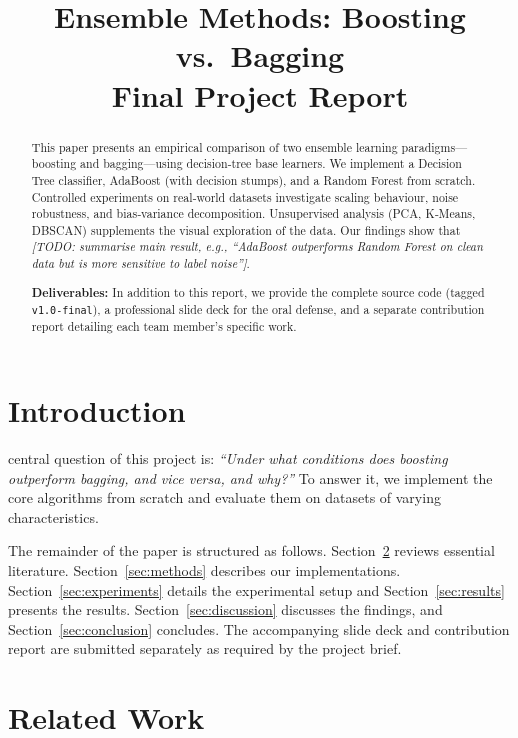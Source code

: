 \documentclass[conference]{IEEEtran}
\title{Ensemble Methods: Boosting vs.\ Bagging\\ {\large Final Project Report}}
\author{
\IEEEauthorblockN{Author One, Author Two, Author Three}
\IEEEauthorblockA{AI Academy, National AI Center\\
Spring 2026\\
\{email1, email2, email3\}@example.com}
}
\begin{document}
\maketitle

\begin{abstract}
This paper presents an empirical comparison of two ensemble learning
paradigms---boosting and bagging---using decision‑tree base learners.
We implement a Decision Tree classifier, AdaBoost (with decision
stumps), and a Random Forest from scratch.  Controlled experiments on
real‑world datasets investigate scaling behaviour, noise robustness,
and bias‑variance decomposition.  Unsupervised analysis (PCA,
K‑Means, DBSCAN) supplements the visual exploration of the data.
Our findings show that \emph{[TODO: summarise main result, e.g.,
“AdaBoost outperforms Random Forest on clean data but is more
sensitive to label noise”]}.

\textbf{Deliverables:} In addition to this report, we provide the
complete source code (tagged \texttt{v1.0-final}), a professional
slide deck for the oral defense, and a separate contribution report
detailing each team member's specific work.
\end{abstract}

\section{Introduction}
\label{sec:intro}
 central question of this project is: \textit{``Under
what conditions does boosting outperform bagging, and vice versa, and
why?''}  To answer it, we implement the core algorithms from scratch
and evaluate them on datasets of varying characteristics.

The remainder of the paper is structured as follows.
Section~\ref{sec:related} reviews essential literature.
Section~\ref{sec:methods} describes our implementations.
Section~\ref{sec:experiments} details the experimental setup and
Section~\ref{sec:results} presents the results.
Section~\ref{sec:discussion} discusses the findings, and
Section~\ref{sec:conclusion} concludes.
The accompanying slide deck and contribution report are submitted
separately as required by the project brief.

\section{Related Work}
\label{sec:related}
\end{document}
